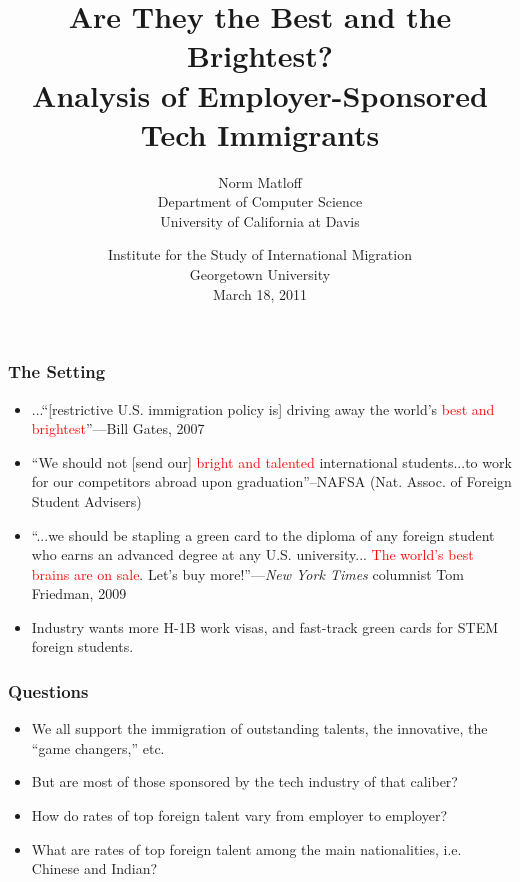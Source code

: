 \documentclass{beamer}
\title{Are They the Best and the Brightest? \\
Analysis of Employer-Sponsored Tech Immigrants}
\author{
Norm Matloff \\
Department of Computer Science \\
University of California at Davis
}
\date{Institute for the Study of International Migration \\
Georgetown University \\
March 18, 2011}
\begin{document}
 

\begin{frame}
\titlepage

\end{frame}

\begin{frame}
\frametitle{The Setting}

\pause

\begin{itemize}

\item ...``[restrictive U.S. immigration policy is] driving away the 
world's \textcolor{red}{best and brightest}''---Bill Gates, 2007
\pause

\item ``We should not [send our] \textcolor{red}{bright and talented}
international students...to work for our competitors abroad upon
graduation''--NAFSA (Nat. Assoc. of Foreign Student Advisers)
\pause

\item ``...we should be stapling a green card to the diploma of any
foreign student who earns an advanced degree at any U.S. university...
\textcolor{red}{The world’s best brains are on sale}. Let’s buy
more!''---{\it New York Times} columnist Tom Friedman, 2009
\pause

\item Industry wants more H-1B work visas, and fast-track green cards
for STEM foreign students.

\end{itemize}

\end{frame}

\begin{frame}
\frametitle{Questions}

\begin{itemize}

\item We all support the immigration of outstanding talents, the
innovative, the ``game changers,'' etc.
\pause

\item But are most of those sponsored by the tech industry of that caliber?
\pause

\item How do rates of top foreign talent vary from employer to employer?
\pause

\item What are rates of top foreign talent among the main nationalities,
i.e. Chinese and Indian?

\end{itemize}

\end{frame}
\end{document}
